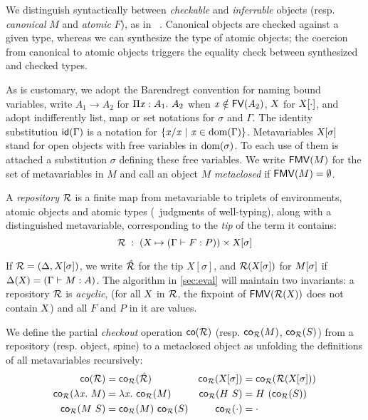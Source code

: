 \documentclass{llncs}
\begin{document}
We distinguish syntactically between \emph{checkable} and
\emph{inferrable} objects (resp. \emph{canonical} $M$ and
\emph{atomic} $F$), as in \eg\ \cite{pierce2000local}. Canonical objects
are checked against a given type, whereas we can synthesize the type
of atomic objects; the coercion from canonical to atomic objects
triggers the equality check between synthesized and checked types.

As is customary, we adopt the Barendregt convention for naming bound
variables, write $A_1\to A_2$ for $\Pi{\ensuremath{\text{\textit{x}}}}:{A_1}.\  {A_2}$ when $\text{\textit{x}}\notin {\text{\textsf{FV}}}({A_2})$, $\text{\textsl{X}}$ for ${\text{\textsl{X}}}[{\cdot}]$, and adopt
indifferently list, map or set notations for $\sigma$ and
$\Gamma$. The identity substitution ${\text{\textsf{id}}}({\Gamma})$ is a notation
for $\{{\text{\textit{x}}}/{\text{\textit{x}}}\ |\ \text{\textit{x}} \in\operatorname{dom}{\!(\Gamma)}\}$. Metavariables
${\text{\textsl{X}}}[{\sigma}]$ stand for open objects with free variables in
$\operatorname{dom}{\!(\sigma)}$. To each use of them is attached a substitution
$\sigma$ defining these free variables. We write ${\text{\textsf{FMV}}}({M})$ for the set
of metavariables in $M$ and call an object $M$ \emph{metaclosed} if
${\text{\textsf{FMV}}}({M}) = \emptyset$.

\begin{definition}
  A \emph{repository} $\mathcal{R}$ is a finite map from metavariable to
  triplets of environments, atomic objects and atomic types (\ie\
  judgments of well-typing), along with a distinguished metavariable,
  corresponding to the \emph{tip} of the term it contains:
$$ \mathcal{R}\;:\;(\text{\textsl{X}} \mapsto (\Gamma\vdash{F}:{P}))\times{\ensuremath{\text{\textsl{X}}}}[{\sigma}] $$
\end{definition}

If $\mathcal{R} = (\Delta, X[\sigma])$, we write $\hat {\mathcal{R}}$ for the tip
$X[\sigma]$, and $\mathcal{R} ({\text{\textsl{X}}}[{\sigma}])$ for ${M}[{\sigma}]$ if
$\Delta(\text{\textsl{X}}) = (\Gamma\vdash M : A)$.  The algorithm in
\ref{sec:eval} will maintain two invariants: a repository $\mathcal{R}$ is
\emph{acyclic}, (for all $\text{\textsl{X}}$ in $\mathcal{R}$, the fixpoint of
${\text{\textsf{FMV}}}({\mathcal{R}(\text{\textsl{X}})})$ does not contain $\text{\textsl{X}}$) and all $F$ and $P$
in it are values.

\begin{definition}
  We define the partial \emph{checkout} operation ${\text{\textsf{co}}}({\mathcal{R}})$
  (resp. ${\text{\textsf{co$_{\mathcal{R}}$}}}({M})$, ${\text{\textsf{co$_{\mathcal{R}}$}}}({S})$) from a repository
  (resp. object, spine) to a metaclosed object as unfolding the
  definitions of all metavariables recursively:
  \begin{align*}
    {\text{\textsf{co}}}({\mathcal{R}}) &= {\text{\textsf{co$_{\mathcal{R}}$}}}({\hat{\mathcal{R}}}) &
    {\text{\textsf{co$_{\mathcal{R}}$}}}({{\text{\textsl{X}}}[{\sigma}]}) &= {\text{\textsf{co$_{\mathcal{R}}$}}}({\mathcal{R}({\text{\textsl{X}}}[{\sigma}])})\\
    {\text{\textsf{co$_{\mathcal{R}}$}}}({\lambda{\ensuremath{\text{\textit{x}}}}.\  M}) &= \lambda{\ensuremath{\text{\textit{x}}}}.\  {\text{\textsf{co$_{\mathcal{R}}$}}}({M}) &
    {\text{\textsf{co$_{\mathcal{R}}$}}}({{H}\  S}) &= {H}\  {({\text{\textsf{co$_{\mathcal{R}}$}}}({S}))} \\
    {\text{\textsf{co$_{\mathcal{R}}$}}}({{M}\ {S}}) &= {{\text{\textsf{co$_{\mathcal{R}}$}}}({M})}\ {{\text{\textsf{co$_{\mathcal{R}}$}}}({S})} &
    {\text{\textsf{co$_{\mathcal{R}}$}}}({\cdot}) &= \cdot
  \end{align*}
\end{definition}
\end{document}
